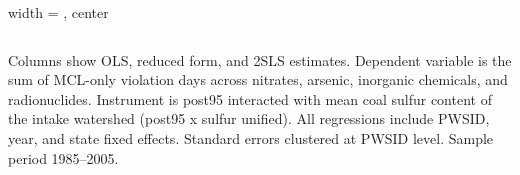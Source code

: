 \begin{table}[htbp]
\begin{adjustbox}{width = \textwidth, center}
\begin{tabular}{lccc}
         \bottomrule
         
      \end{tabular}
      
      
      
   \end{adjustbox}
      {\tiny\linespread{1}\selectfont \par \raggedright 
   Columns show OLS, reduced form, and 2SLS estimates. Dependent variable is the sum of MCL-only violation days across nitrates, arsenic, inorganic chemicals, and radionuclides. Instrument is post95 interacted with mean coal sulfur content of the intake watershed (post95 x sulfur unified). All regressions include PWSID, year, and state fixed effects. Standard errors clustered at PWSID level. Sample period 1985--2005.}
   
\end{table}


